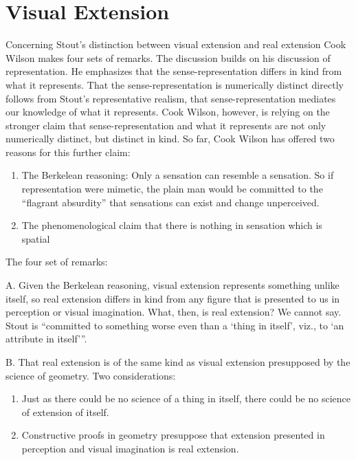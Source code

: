 \documentclass[11pt]{article}
\begin{document}

\section{Visual Extension}\label{sec:visual_extension} %

Concerning Stout's distinction between visual extension and real extension Cook Wilson makes four sets of remarks. The discussion builds on his discussion of representation. He emphasizes that the sense-representation differs in kind from what it represents. That the sense-representation is numerically distinct directly follows from Stout's representative realism, that sense-representation mediates our knowledge of what it represents. Cook Wilson, however, is relying on the stronger claim that sense-representation and what it represents are not only numerically distinct, but distinct in kind. So far, Cook Wilson has offered two reasons for this further claim:
    \begin{enumerate}
    	\item The Berkelean reasoning: Only a sensation can resemble a sensation. So if representation were mimetic, the plain man would be committed to the ``flagrant absurdity'' that sensations can exist and change unperceived.
    	\item The phenomenological claim that there is nothing in sensation which is spatial
    \end{enumerate}

The four set of remarks:

A. Given the Berkelean reasoning, visual extension represents something unlike itself, so real extension differs in kind from any figure that is presented to us in perception or visual imagination. What, then, is real extension? We cannot say. Stout is ``committed to something worse even than a `thing in itself', viz., to `an attribute in itself'''.

B. That real extension is of the same kind as visual extension presupposed by the science of geometry. Two considerations:
    \begin{enumerate}
    	\item Just as there could be no science of a thing in itself, there could be no science of extension of itself.
	    \item Constructive proofs in geometry presuppose that extension presented in perception and visual imagination is real extension.
    \end{enumerate}
\end{document}
